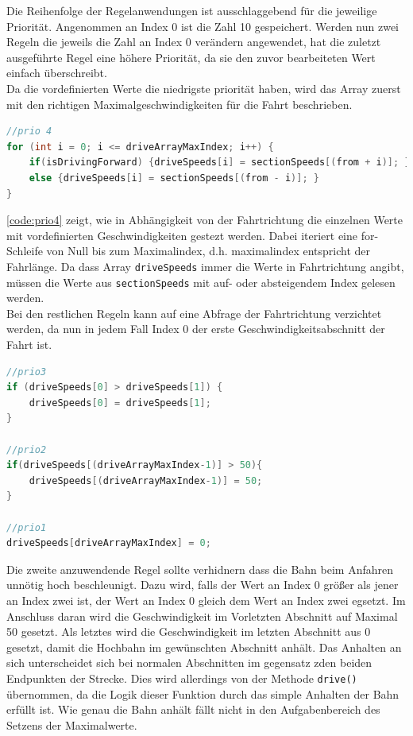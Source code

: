 Die Reihenfolge der Regelanwendungen ist ausschlaggebend für die jeweilige Priorität. Angenommen an Index 0 ist die Zahl 10 gespeichert. Werden nun zwei Regeln die jeweils die Zahl an Index 0 verändern angewendet, hat die zuletzt ausgeführte Regel eine höhere Priorität, da sie den zuvor bearbeiteten Wert einfach überschreibt. \\
Da die vordefinierten Werte die niedrigste priorität haben, wird das Array zuerst mit den richtigen Maximalgeschwindigkeiten für die Fahrt beschrieben. 
\vspace{0.5cm}
\begin{lstlisting}[language=c, style=dhpaperdefault]
//prio 4
for (int i = 0; i <= driveArrayMaxIndex; i++) {
	if(isDrivingForward) {driveSpeeds[i] = sectionSpeeds[(from + i)]; }
	else {driveSpeeds[i] = sectionSpeeds[(from - i)]; }
}

\end{lstlisting}
\vspace{0.5cm}
\autoref{code:prio4} zeigt, wie in Abhängigkeit von der Fahrtrichtung die einzelnen Werte mit vordefinierten Geschwindigkeiten gestezt werden. Dabei iteriert eine for-Schleife von Null bis zum Maximalindex, d.h. maximalindex entspricht der Fahrlänge. Da dass Array \texttt{driveSpeeds} immer die Werte in Fahrtrichtung angibt, müssen die Werte aus \texttt{sectionSpeeds} mit auf- oder absteigendem Index gelesen werden. \\
Bei den restlichen Regeln kann auf eine Abfrage der Fahrtrichtung verzichtet werden, da nun in jedem Fall Index 0 der erste Geschwindigkeitsabschnitt der Fahrt ist.
\vspace{0.5cm}
\begin{lstlisting}[language=c, style=dhpaperdefault]
//prio3
if (driveSpeeds[0] > driveSpeeds[1]) {
	driveSpeeds[0] = driveSpeeds[1];
}

//prio2
if(driveSpeeds[(driveArrayMaxIndex-1)] > 50){
	driveSpeeds[(driveArrayMaxIndex-1)] = 50;
}

//prio1
driveSpeeds[driveArrayMaxIndex] = 0; 
\end{lstlisting}
\vspace{0.5cm}
Die zweite anzuwendende Regel sollte verhidnern dass die Bahn beim Anfahren unnötig hoch beschleunigt. Dazu wird, falls der Wert an Index 0 größer als jener an Index zwei ist, der Wert an Index 0 gleich dem Wert an Index zwei egsetzt. Im Anschluss daran wird die Geschwindigkeit im Vorletzten Abschnitt auf Maximal 50 gesetzt. Als letztes wird die Geschwindigkeit im letzten Abschnitt aus 0 gesetzt, damit die Hochbahn im gewünschten Abschnitt anhält. Das Anhalten an sich unterscheidet sich bei normalen Abschnitten im gegensatz zden beiden Endpunkten der Strecke. Dies wird allerdings von der Methode \texttt{drive()} übernommen, da die Logik dieser Funktion durch das simple Anhalten der Bahn erfüllt ist. Wie genau die Bahn anhält fällt nicht in den Aufgabenbereich des Setzens der Maximalwerte.






